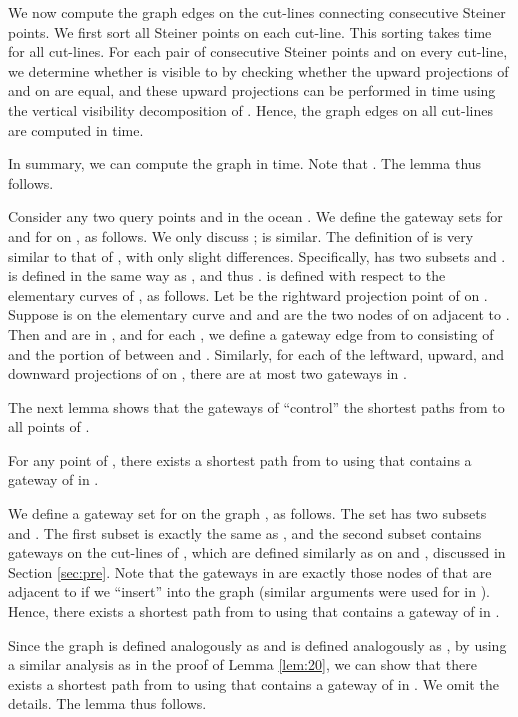\documentclass[english,runningheads,11pt]{llncs}
\newenvironment{proof}{\noindent {\textbf{Proof:}}\rm}{\hfill \rm}
\begin{document}
\begin{proof}
We now compute the graph edges on the cut-lines connecting consecutive
Steiner points. We first sort all Steiner points on each cut-line. This
sorting takes  time for all
cut-lines. For each pair of consecutive Steiner points  and  on
every cut-line, we determine whether  is visible to  by
checking whether the upward projections of  and  on
 are equal, and these upward projections can be
performed in  time using the vertical visibility
decomposition of . Hence, the graph edges on all cut-lines are
computed in  time.

In summary, we can compute the graph  in  time. Note that . The
lemma thus follows.
\end{proof}


Consider any two query points  and  in the ocean
. We define the gateway sets
 for  and  for  on ,
as follows. We only discuss ;
 is similar. The definition of
 is very similar to that of , with only
slight differences. Specifically,  has two subsets
 and .
 is defined in the same way as
, and thus .
 is defined with respect to the elementary
curves of , as follows. Let  be the rightward projection point of 
on . Suppose  is on the elementary curve  and
 and  are the two
nodes of  on  adjacent to . Then  and 
are in , and for each , we define a gateway edge from  to  consisting of
 and the portion of  between  and . Similarly,
for each of the leftward, upward, and downward projections of  on
, there are at most two gateways in .

The next lemma shows that the gateways of 
``control'' the shortest paths from  to all points of .

\begin{lemma}\label{lem:60}
For any point  of , there exists a shortest path from
 to  using  that contains a gateway of  in
.
\end{lemma}
\begin{proof}
We define a gateway set  for  on the graph
, as follows. The set 
has two subsets  and
. The first subset 
is exactly the same as , and the second subset
 contains gateways on the cut-lines of
, which are defined similarly as  on
 and , discussed in Section \ref{sec:pre}. Note
that the gateways in  are exactly those nodes
of  that are adjacent to  if we ``insert'' 
into the graph  (similar arguments were used for
 in \cite{ref:ChenSh00}). Hence, there exists a
shortest path from  to  using  that contains a
gateway of  in .

Since the graph  is defined analogously as  and
 is defined analogously as , by using a similar
analysis as in the proof of Lemma \ref{lem:20}, we can show that there
exists a shortest path from  to  using  that contains a
gateway of  in . We omit the details. The
lemma thus follows.
\end{proof}
\end{document}
